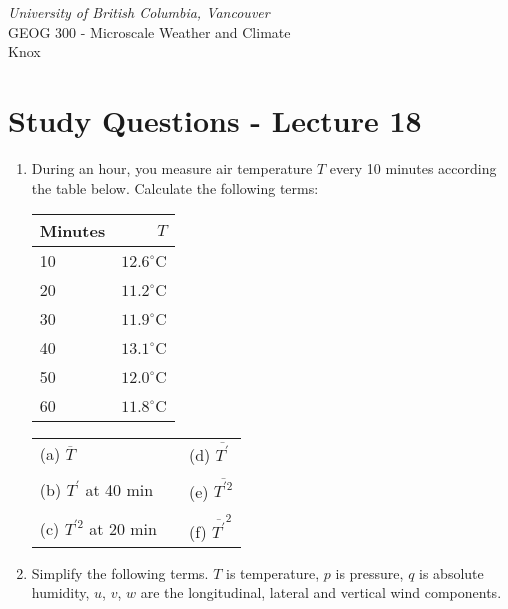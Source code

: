 \documentclass[11pt]{article}
\author{Andy Black and Andreas Christen}
\begin{document}
\begin{center}
\emph{University of British Columbia, Vancouver}\\
GEOG 300 - Microscale Weather and Climate\\
Knox
\section*{Study Questions - Lecture 18}
\end{center}

\begin{enumerate}

\item During an hour, you measure air temperature $T$ every 10 minutes according the table below. Calculate the following terms:

\begin{center}
\begin{tabular}{|l|r|}
\hline
Minutes & $T$ \\
\hline
10 & $12.6^{\circ}\textrm{C}$ \\
\hline
20 & $11.2^{\circ}\textrm{C}$ \\
\hline
30 & $11.9^{\circ}\textrm{C}$ \\
\hline
40 & $13.1^{\circ}\textrm{C}$ \\
\hline
50 & $12.0^{\circ}\textrm{C}$ \\
\hline
60 & $11.8^{\circ}\textrm{C}$ \\
\hline
\end{tabular}
\end{center}

\vspace{0.2cm}
\begin{tabular}{lll}
(a) $\overline{T}$ & \hspace{1cm} & (d) $\overline{T^{\prime}}$  \\
\vspace{0.1cm}\\
(b) $T^{\prime}$ at 40 min & \hspace{1cm} &  (e) $\overline{T^{\prime 2}}$  \\
\vspace{0.1cm}\\
(c)  $T^{\prime 2}$ at 20 min  & \hspace{1.94cm} &  (f) $\overline{T^{\prime}}^2$ \\
\end{tabular}
\vspace{0.2cm}

\item Simplify the following terms. $T$ is temperature, $p$ is pressure, $q$ is absolute humidity, $u$, $v$, $w$ are the longitudinal, lateral and vertical wind components.


\end{enumerate}
\end{document}
